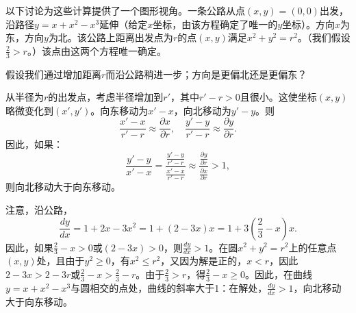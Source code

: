 \begin{translation}
以下讨论为这些计算提供了一个图形视角。一条公路从点$(x, y) = (0,0)$出发，沿路径$y = x + x^2 - x^3$延伸（给定$x$坐标，由该方程确定了唯一的$y$坐标）。方向$x$为东，方向$y$为北。该公路上距离出发点为$r$的点$(x, y)$满足$x^2 + y^2 = r^2$。（我们假设$\frac{2}{3} > r$。）该点由这两个方程唯一确定。

假设我们通过增加距离$r$而沿公路稍进一步；方向是更偏北还是更偏东？

从半径为$r$的出发点，考虑半径增加到$r'$，其中$r' - r > 0$且很小。这使坐标$(x, y)$略微变化到$(x', y')$。向东移动为$x' - x$，向北移动为$y' - y$。则
\[
\frac{x' - x}{r' - r} \approx \frac{\partial x}{\partial r}, \quad \frac{y' - y}{r' - r} \approx \frac{\partial y}{\partial r}.
\]
因此，如果：
\[
\frac{y' - y}{x' - x} = \frac{\frac{y'-y}{r'-r}}{\frac{x'-x}{r'-r}} \approx \frac{\frac{\partial y}{\partial r}}{\frac{\partial x}{\partial r}} > 1,
\]
则向北移动大于向东移动。

注意，沿公路，
\[
\frac{dy}{dx} = 1 + 2x - 3x^2 = 1 + (2 - 3x)x = 1 + 3\!\left(\frac{2}{3} - x\right)\!x.
\]
因此，如果$\frac{2}{3} - x > 0$或$(2 - 3x) > 0$，则$\frac{dy}{dx} > 1$。在圆$x^2 + y^2 = r^2$上的任意点$(x, y)$处，且由于$y^2 \ge 0$，有$x^2 \le r^2$，又因为解是正的，$x < r$，因此$2 - 3x > 2 - 3r$或$\frac{2}{3} - x > \frac{2}{3} - r$。由于$\frac{2}{3} > r$，得$\frac{2}{3} - x \ge 0$。因此，在曲线$y = x + x^2 - x^3$与圆相交的点处，曲线的斜率大于1：在解处，$\frac{dy}{dx} > 1$，向北移动大于向东移动。
\end{translation}

